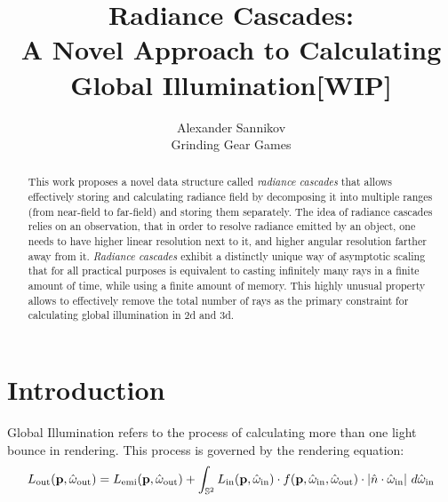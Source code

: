\documentclass{jcgt}
\begin{document}
\title{Radiance Cascades:\\A Novel Approach to Calculating Global Illumination[WIP]}

\author
       {Alexander Sannikov\\Grinding Gear Games
       }


\maketitle
\thispagestyle{firstpagestyle}

\begin{abstract}
\small
This work proposes a novel data structure called \emph{radiance cascades} that allows effectively storing and calculating radiance field by decomposing it into multiple ranges (from near-field to far-field) and storing them separately. The idea of radiance cascades relies on an observation, that in order to resolve
radiance emitted by an object, one needs to have higher linear resolution next to it, and higher angular resolution farther away from it. \emph{Radiance cascades} exhibit a distinctly unique way of asymptotic scaling that for all practical purposes is equivalent to casting infinitely many rays in a finite amount of time, while using a finite amount of memory. This highly unusual property allows to effectively remove the total number of rays as the primary constraint for calculating global illumination in 2d and 3d.
\end{abstract}


\section{Introduction}
\label{sec:introduction}
Global Illumination refers to the process of calculating more than one light bounce in rendering. This process is governed by the rendering equation:
\begin{equation}
  L_\mathrm{out}(\textbf{p}, \hat \omega_\mathrm{out}) = L_\mathrm{emi}(\textbf{p}, \hat \omega_\mathrm{out}) + \int_{\mathbb{S}^2} L_\mathrm{in}(\textbf{p}, \hat \omega_\mathrm{in}) \cdot f(\textbf p, \hat \omega_\mathrm{in}, \hat{\omega}_\mathrm{out}) \cdot |\hat{n} \cdot \hat{\omega}_\mathrm{in} |~ d\hat{\omega}_\mathrm{in}
  \label{eqn:rendering}
\end{equation}
  
\end{document}
